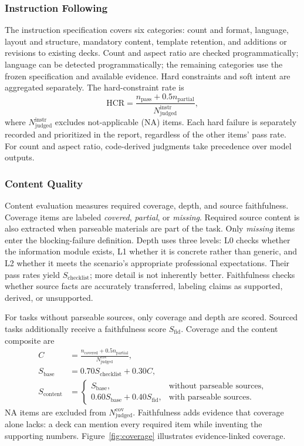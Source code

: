 \subsubsection{Instruction Following}
The instruction specification covers six categories: count and format, language, layout and structure, mandatory content, template retention, and additions or revisions to existing decks. Count and aspect ratio are checked programmatically; language can be detected programmatically; the remaining categories use the frozen specification and available evidence. Hard constraints and soft intent are aggregated separately. The hard-constraint rate is
\begin{equation}
\mathrm{HCR}=\frac{n_{\mathrm{pass}}+0.5n_{\mathrm{partial}}}{N^{\mathrm{instr}}_{\mathrm{judged}}},
\end{equation}
where $N^{\mathrm{instr}}_{\mathrm{judged}}$ excludes not-applicable (NA) items. Each hard failure is separately recorded and prioritized in the report, regardless of the other items' pass rate. For count and aspect ratio, code-derived judgments take precedence over model outputs.

\subsubsection{Content Quality}
Content evaluation measures required coverage, depth, and source faithfulness. Coverage items are labeled \emph{covered}, \emph{partial}, or \emph{missing}. Required source content is also extracted when parseable materials are part of the task. Only \emph{missing} items enter the blocking-failure definition. Depth uses three levels: L0 checks whether the information module exists, L1 whether it is concrete rather than generic, and L2 whether it meets the scenario's appropriate professional expectations. Their pass rates yield $S_{\mathrm{checklist}}$; more detail is not inherently better. Faithfulness checks whether source facts are accurately transferred, labeling claims as supported, derived, or unsupported.

For tasks without parseable sources, only coverage and depth are scored. Sourced tasks additionally receive a faithfulness score $S_{\mathrm{fid}}$. Coverage and the content composite are
\begin{align}
C &= \frac{n_{\mathrm{covered}}+0.5n_{\mathrm{partial}}}{N^{\mathrm{cov}}_{\mathrm{judged}}},\\
S_{\mathrm{base}} &= 0.70 S_{\mathrm{checklist}}+0.30 C,\\
S_{\mathrm{content}} &=
\begin{cases}S_{\mathrm{base}},&\text{without parseable sources},\\
0.60S_{\mathrm{base}}+0.40S_{\mathrm{fid}},&\text{with parseable sources}.
\end{cases}
\end{align}
NA items are excluded from $N^{\mathrm{cov}}_{\mathrm{judged}}$. Faithfulness adds evidence that coverage alone lacks: a deck can mention every required item while inventing the supporting numbers. Figure~\ref{fig:coverage} illustrates evidence-linked coverage.

